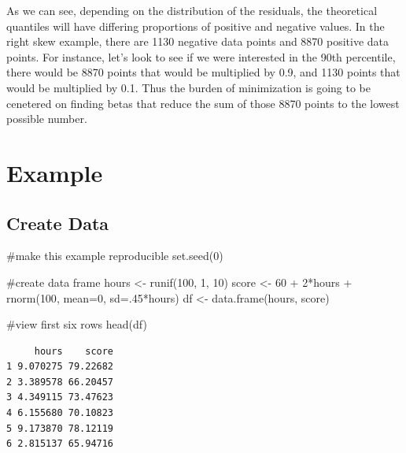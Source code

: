 \documentclass[
  letterpaper,
  DIV=11,
  numbers=noendperiod]{scrreprt}
\newenvironment{Shaded}{\begin{snugshade}}{\end{snugshade}}
\newcommand{\AttributeTok}[1]{\textcolor[rgb]{0.40,0.45,0.13}{#1}}
\newcommand{\CommentTok}[1]{\textcolor[rgb]{0.37,0.37,0.37}{#1}}
\newcommand{\DecValTok}[1]{\textcolor[rgb]{0.68,0.00,0.00}{#1}}
\newcommand{\FunctionTok}[1]{\textcolor[rgb]{0.28,0.35,0.67}{#1}}
\newcommand{\NormalTok}[1]{\textcolor[rgb]{0.00,0.23,0.31}{#1}}
\newcommand{\OtherTok}[1]{\textcolor[rgb]{0.00,0.23,0.31}{#1}}
\newcommand{\SpecialCharTok}[1]{\textcolor[rgb]{0.37,0.37,0.37}{#1}}
\begin{document}
As we can see, depending on the distribution of the residuals, the
theoretical quantiles will have differing proportions of positive and
negative values. In the right skew example, there are 1130 negative data
points and 8870 positive data points. For instance, let's look to see if
we were interested in the 90th percentile, there would be 8870 points
that would be multiplied by 0.9, and 1130 points that would be
multiplied by 0.1. Thus the burden of minimization is going to be
cenetered on finding betas that reduce the sum of those 8870 points to
the lowest possible number.

\hypertarget{example}{%
\section{Example}\label{example}}

\hypertarget{create-data}{%
\subsection{Create Data}\label{create-data}}

\begin{Shaded}
\begin{Highlighting}[]
\CommentTok{\#make this example reproducible}
\FunctionTok{set.seed}\NormalTok{(}\DecValTok{0}\NormalTok{)}

\CommentTok{\#create data frame }
\NormalTok{hours }\OtherTok{\textless{}{-}} \FunctionTok{runif}\NormalTok{(}\DecValTok{100}\NormalTok{, }\DecValTok{1}\NormalTok{, }\DecValTok{10}\NormalTok{)}
\NormalTok{score }\OtherTok{\textless{}{-}} \DecValTok{60} \SpecialCharTok{+} \DecValTok{2}\SpecialCharTok{*}\NormalTok{hours }\SpecialCharTok{+} \FunctionTok{rnorm}\NormalTok{(}\DecValTok{100}\NormalTok{, }\AttributeTok{mean=}\DecValTok{0}\NormalTok{, }\AttributeTok{sd=}\NormalTok{.}\DecValTok{45}\SpecialCharTok{*}\NormalTok{hours)}
\NormalTok{df }\OtherTok{\textless{}{-}} \FunctionTok{data.frame}\NormalTok{(hours, score)}

\CommentTok{\#view first six rows}
\FunctionTok{head}\NormalTok{(df)}
\end{Highlighting}
\end{Shaded}

\begin{verbatim}
     hours    score
1 9.070275 79.22682
2 3.389578 66.20457
3 4.349115 73.47623
4 6.155680 70.10823
5 9.173870 78.12119
6 2.815137 65.94716
\end{verbatim}
\end{document}
